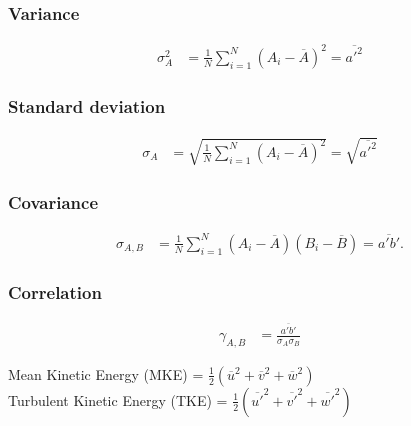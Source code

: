 \documentclass[fleqn,10pt]{SelfArx} %
\begin{document}
\subsubsection{Variance}
\begin{align*}
	\sigma_A^2 & = \frac{1}{N} \sum^N_{i=1}(A_i-\overline{A})^2 = \overline{a'^2}
\end{align*}

\subsubsection{Standard deviation}
\begin{align*}
	\sigma_A & = \sqrt{\frac{1}{N} \sum^N_{i=1}(A_i-\overline{A})^2} = \sqrt{\overline{a'^2}}
\end{align*}

\subsubsection{Covariance}
\begin{align*}
	\sigma_{A,B} & = \frac{1}{N} \sum_{i=1}^N (A_i - \overline{A})(B_i - \overline{B}) = \overline{a'b'}.
\end{align*}

\subsubsection{Correlation}
\begin{align*}
	\gamma_{A,B} & = \frac{\overline{a'b'}}{\sigma_A\sigma_B}
\end{align*}

Mean Kinetic Energy (MKE) = $\frac{1}{2}(\overline{u}^2 + \overline{v}^2 +\overline{w}^2)$ \\
Turbulent Kinetic Energy (TKE) = $\frac{1}{2}(\overline{u'}^2 + \overline{v'}^2 +\overline{w'}^2)$
\end{document}
